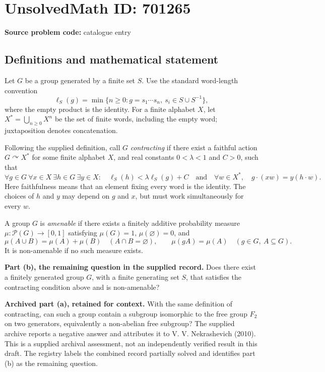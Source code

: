\documentclass[11pt]{article}
\begin{document}
\section*{UnsolvedMath ID: 701265}
\textbf{Source problem code:} catalogue entry
\subsection{Definitions and mathematical statement}
Let \(G\) be a group generated by a finite set \(S\). Use the standard word-length convention
\[
\ell_S(g)=\min\{n\geq 0:g=s_1\cdots s_n,\ s_i\in S\cup S^{-1}\},
\]
where the empty product is the identity. For a finite alphabet \(X\), let \(X^*=\bigcup_{n\geq0}X^n\) be the set of finite words, including the empty word; juxtaposition denotes concatenation.

Following the supplied definition, call \(G\) \emph{contracting} if there exist a faithful action \(G\curvearrowright X^*\) for some finite alphabet \(X\), and real constants \(0<\lambda<1\) and \(C>0\), such that
\[
\forall g\in G\ \forall x\in X\ \exists h\in G\ \exists y\in X:
\quad \ell_S(h)<\lambda\ell_S(g)+C
\quad\text{and}\quad
\forall w\in X^*,\quad g\cdot(xw)=y(h\cdot w).
\]
Here faithfulness means that an element fixing every word is the identity. The choices of \(h\) and \(y\) may depend on \(g\) and \(x\), but must work simultaneously for every \(w\).

A group \(G\) is \emph{amenable} if there exists a finitely additive probability measure \(\mu:\mathcal P(G)\to[0,1]\) satisfying \(\mu(G)=1\), \(\mu(\varnothing)=0\), and
\[
\mu(A\cup B)=\mu(A)+\mu(B)\quad(A\cap B=\varnothing),
\qquad
\mu(gA)=\mu(A)\quad(g\in G,\ A\subseteq G).
\]
It is non-amenable if no such measure exists.

\textbf{Part (b), the remaining question in the supplied record.} Does there exist a finitely generated group \(G\), with a finite generating set \(S\), that satisfies the contracting condition above and is non-amenable?

\textbf{Archived part (a), retained for context.} With the same definition of contracting, can such a group contain a subgroup isomorphic to the free group \(F_2\) on two generators, equivalently a non-abelian free subgroup? The supplied archive reports a negative answer and attributes it to V. V. Nekrashevich (2010). This is a supplied archival assessment, not an independently verified result in this draft. The registry labels the combined record partially solved and identifies part (b) as the remaining question.
\end{document}
